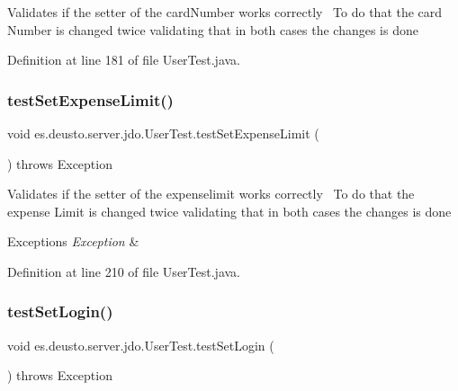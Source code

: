 Validates if the setter of the card\+Number works correctly~\newline
To do that the card Number is changed twice validating that in both cases the changes is done 

Definition at line 181 of file User\+Test.\+java.

\mbox{\label{classes_1_1deusto_1_1server_1_1jdo_1_1_user_test_a62ce453431218996d80c2f0f57249513}} 
\subsubsection{\texorpdfstring{test\+Set\+Expense\+Limit()}{testSetExpenseLimit()}}
{\footnotesize\ttfamily void es.\+deusto.\+server.\+jdo.\+User\+Test.\+test\+Set\+Expense\+Limit (\begin{DoxyParamCaption}{ }\end{DoxyParamCaption}) throws Exception}

Validates if the setter of the expenselimit works correctly~\newline
To do that the expense Limit is changed twice validating that in both cases the changes is done~\newline

\begin{DoxyExceptions}{Exceptions}
{\em Exception} & \\
\hline
\end{DoxyExceptions}


Definition at line 210 of file User\+Test.\+java.

\mbox{\label{classes_1_1deusto_1_1server_1_1jdo_1_1_user_test_abc3bb7420be9628bc36ef599e8d8ee18}} 
\subsubsection{\texorpdfstring{test\+Set\+Login()}{testSetLogin()}}
{\footnotesize\ttfamily void es.\+deusto.\+server.\+jdo.\+User\+Test.\+test\+Set\+Login (\begin{DoxyParamCaption}{ }\end{DoxyParamCaption}) throws Exception}

